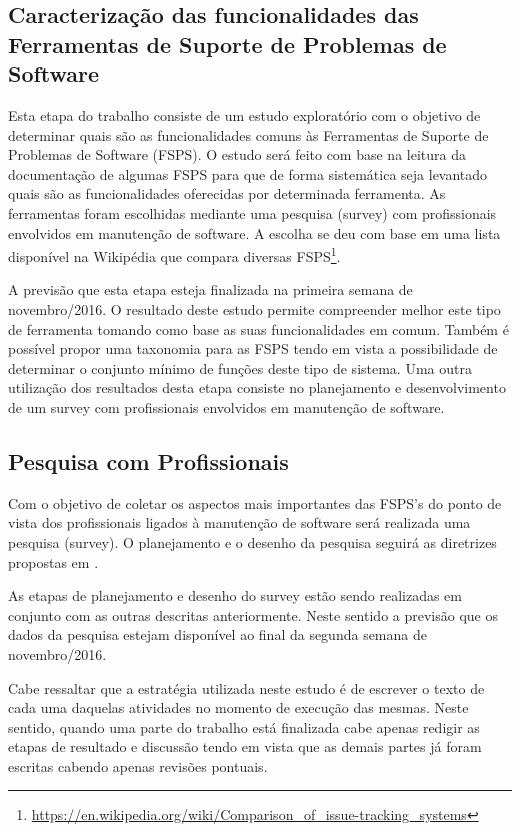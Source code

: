 \documentclass[10pt,a4paper]{report}
\begin{document}
\subsection{Caracterização das funcionalidades das Ferramentas de Suporte de Problemas de Software }
\label{subsec:caracterizacao}

Esta etapa do trabalho consiste de um estudo exploratório com o objetivo de
determinar quais são as funcionalidades comuns às Ferramentas de Suporte de
Problemas de Software (FSPS). O estudo será feito com base na leitura da
documentação de algumas FSPS para que de forma sistemática seja levantado quais
são as funcionalidades oferecidas por determinada ferramenta. As ferramentas
foram escolhidas mediante uma pesquisa (survey) com profissionais envolvidos em
manutenção de software. A escolha se deu com base em uma lista disponível na
Wikipédia que compara diversas
FSPS\footnote{\url{https://en.wikipedia.org/wiki/Comparison_of_issue-tracking_systems}}.

A previsão que esta etapa esteja finalizada na primeira semana de novembro/2016.
O resultado deste estudo permite compreender melhor este tipo de ferramenta
tomando como base as suas funcionalidades em comum. Também é possível propor
uma taxonomia para as FSPS tendo em vista a possibilidade de determinar o
conjunto mínimo de funções deste tipo de sistema. Uma outra utilização dos
resultados desta etapa consiste no planejamento e desenvolvimento de um survey
com profissionais envolvidos em manutenção de software.

\subsection{Pesquisa com Profissionais}
\label{subsec:survey}
Com o objetivo de coletar os aspectos mais importantes das FSPS's do ponto de
vista dos profissionais ligados à manutenção de software será realizada uma
pesquisa (survey). O planejamento e o desenho da pesquisa seguirá as diretrizes
propostas em \cite{wohlin2012experimentation}.

As etapas de planejamento e desenho do survey  estão sendo realizadas em
conjunto com as outras descritas anteriormente. Neste sentido a previsão que os
dados da pesquisa estejam disponível ao final da segunda semana de
novembro/2016.

Cabe ressaltar que a estratégia utilizada neste estudo é de escrever o texto de
cada uma daquelas atividades no momento de execução das mesmas. Neste sentido,
quando uma parte do trabalho está finalizada cabe apenas redigir as etapas de
resultado e discussão tendo em vista que as demais partes já foram escritas
cabendo apenas revisões pontuais.
\end{document}
